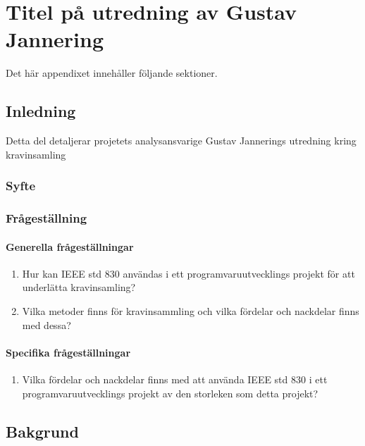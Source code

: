 \chapter{Titel på utredning av Gustav Jannering}
\label{cha:indiv-report-person}

Det här appendixet innehåller följande sektioner.

\section{Inledning}
\label{sec:introduction-person}

Detta del detaljerar projetets analysansvarige Gustav Jannerings utredning kring kravinsamling

\subsection{Syfte}
\label{sec:purpose-person}


\subsection{Frågeställning}
\label{sec:issue-person}

\subsubsection{Generella frågeställningar}
\begin{enumerate}
	\item Hur kan IEEE std 830 användas i ett programvaruutvecklings projekt för att underlätta kravinsamling?
	\item Vilka metoder finns för kravinsammling och vilka fördelar och nackdelar finns med dessa? 
\end{enumerate}
\subsubsection{Specifika frågeställningar}
\begin{enumerate}
	\item Vilka fördelar och nackdelar finns med att använda IEEE std 830 i ett programvaruutvecklings projekt av den storleken som detta projekt?
\end{enumerate}
\section{Bakgrund}
\label{sec:background-person}

